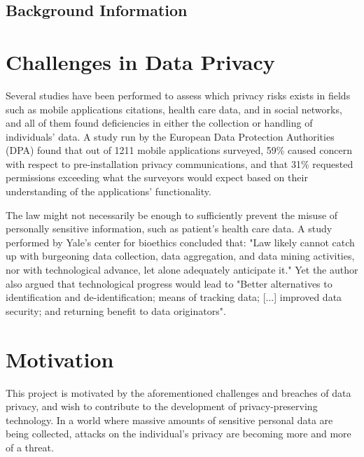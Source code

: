 \subsection{Background Information}	


\section{Challenges in Data Privacy}

Several studies have been performed to assess which privacy risks exists in fields such as mobile applications {citations}, health care data, and in social networks, and all of them found deficiencies in either the collection or handling of individuals' data. A study run by the European Data Protection Authorities (DPA) found that out of 1211 mobile applications surveyed, 59\% caused concern with respect to pre-installation privacy communications, and that 31\%  requested permissions exceeding what the surveyors would expect based on their understanding of the applications’ functionality\cite{EUprivacySweep2014}. 

The law might not necessarily be enough to sufficiently prevent the misuse of personally sensitive information, such as patient's health care data. A study performed by Yale's center for bioethics concluded that: "Law likely cannot catch up with burgeoning data collection, data aggregation, and data
mining activities, nor with technological advance, let alone adequately anticipate it." Yet the author also argued that technological progress would lead to "Better alternatives to identification and de-identification;  means of tracking data; [...] improved data security; and returning benefit to data originators"\cite{kaplan2014patient}.

\section{Motivation}
This project is motivated by the aforementioned challenges and breaches of data privacy, and wish to contribute to the development of privacy-preserving technology. In a world where massive amounts of sensitive personal data are being collected, attacks on the individual's privacy are becoming more and more of a threat.

